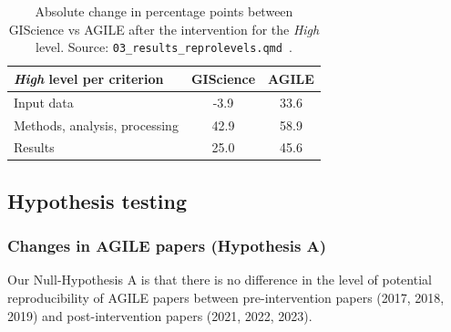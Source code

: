 \documentclass{josis}
\begin{document}



\begin{table}
\centering
\begin{tabular*}{\linewidth}{@{\extracolsep{\fill}}lcc}
\toprule
\textit{High} level per criterion & GIScience & AGILE \\ 
\midrule\addlinespace[2.5pt]
Input data  & -3.9 & 33.6 \\ 
Methods, analysis, processing  & 42.9 & 58.9 \\ 
Results  & 25.0 & 45.6 \\ 
\bottomrule
\end{tabular*}
\caption{Absolute change in percentage points between GIScience vs AGILE after the intervention for the \emph{High} level. Source: \texttt{03\_results\_reprolevels.qmd}~\cite{data}.}\label{tbl:change}
\end{table}


\subsection{Hypothesis testing}
\label{sec:results:hypothesis}

\subsubsection{Changes in AGILE papers (Hypothesis A)}

Our Null-Hypothesis A is that there is no difference in the level of potential reproducibility of AGILE papers between pre-intervention papers (2017, 2018, 2019) and post-intervention papers (2021, 2022, 2023). 
\end{document}
